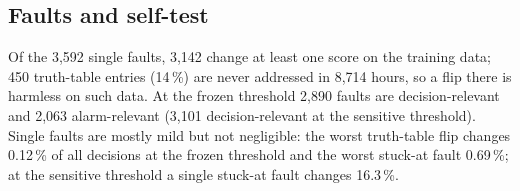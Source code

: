 \documentclass[conference]{IEEEtran}
\begin{document}
\begin{table}[t]\centering
\caption{Cost of the LUT-native classifiers (XCK26; input registers, comparators, network, score, decision and alarm
logic). Vivado 2026.1 out of context, 2.5-ns constraint, vectorless power at 400\,MHz; Yosys \texttt{synth\_xilinx}.}\label{tab:hw}
\setlength{\tabcolsep}{2.6pt}
\end{table}

\subsection{Faults and self-test}
Of the 3,592 single faults, 3,142 change at least one score on the training data; 450 truth-table entries (14\,\%)
are never addressed in 8,714 hours, so a flip there is harmless on such data. At the frozen threshold 2,890 faults are
decision-relevant and 2,063 alarm-relevant (3,101 decision-relevant at the sensitive threshold). Single faults are
mostly mild but not negligible: the worst truth-table flip changes 0.12\,\% of all decisions at the frozen threshold
and the worst stuck-at fault 0.69\,\%; at the sensitive threshold a single stuck-at fault changes 16.3\,\%.


\end{document}
